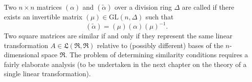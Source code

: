 Two $n \times n$ matrices $(\alpha)$ and $(\tilde{\alpha})$ over a division ring $\Delta$ are called  if there exists an invertible matrix $(\mu) \in \mathrm{GL}(n, \Delta)$ such that
$$(\tilde{\alpha}) = (\mu)(\alpha)(\mu)^{-1}.$$
Two square matrices are similar if and only if they represent the same linear transformation $A \in \mathfrak{L}(\mathfrak{R}, \mathfrak{R})$ relative to (possibly different) bases of the $n$-dimensional space $\mathfrak{R}$. The problem of determining similarity conditions requires a fairly elaborate analysis (to be undertaken in the next chapter on the theory of a single linear transformation).
